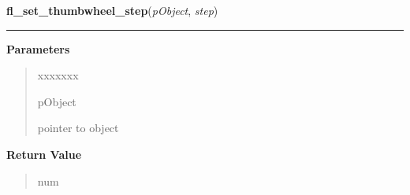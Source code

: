     \label{xformslib:library:fl_set_thumbwheel_step}

    \vspace{0.5ex}

\hspace{.8\funcindent}\begin{boxedminipage}{\funcwidth}

    \raggedright \textbf{fl\_set\_thumbwheel\_step}(\textit{pObject}, \textit{step})

    \vspace{-1.5ex}

    \rule{\textwidth}{0.5\fboxrule}
\setlength{\parskip}{2ex}
\setlength{\parskip}{1ex}
      \textbf{Parameters}
      \vspace{-1ex}

      \begin{quote}
        \begin{Ventry}{xxxxxxx}

          \item[pObject]

          pointer to object

        \end{Ventry}

      \end{quote}

      \textbf{Return Value}
    \vspace{-1ex}

      \begin{quote}
      num

      \end{quote}

    \end{boxedminipage}

    \label{xformslib:library:fl_set_thumbwheel_return}

    \vspace{0.5ex}

